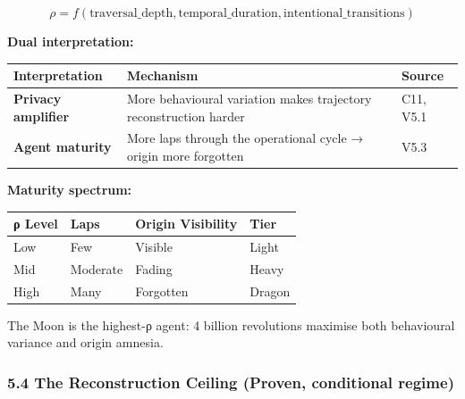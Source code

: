 \documentclass[
]{article}
\newcounter{none} %
\begin{document}
\[\rho = f(\text{traversal\_depth}, \text{temporal\_duration}, \text{intentional\_transitions})\]

\textbf{Dual interpretation:}

{\def\LTcaptype{none} %
\begin{longtable}[]{@{}
  >{\raggedright\arraybackslash}p{}
  >{\raggedright\arraybackslash}p{}
  >{\raggedright\arraybackslash}p{}@{}}
\toprule\noalign{}
\begin{minipage}[b]{\linewidth}\raggedright
Interpretation
\end{minipage} & \begin{minipage}[b]{\linewidth}\raggedright
Mechanism
\end{minipage} & \begin{minipage}[b]{\linewidth}\raggedright
Source
\end{minipage} \\
\midrule\noalign{}
\endhead
\bottomrule\noalign{}
\endlastfoot
\textbf{Privacy amplifier} & More behavioural variation makes trajectory
reconstruction harder & C11, V5.1 \\
\textbf{Agent maturity} & More laps through the operational cycle →
origin more forgotten & V5.3 \\
\end{longtable}
}

\textbf{Maturity spectrum:}

{\def\LTcaptype{none} %
\begin{longtable}[]{@{}llll@{}}
\toprule\noalign{}
ρ Level & Laps & Origin Visibility & Tier \\
\midrule\noalign{}
\endhead
\bottomrule\noalign{}
\endlastfoot
Low & Few & Visible & Light \\
Mid & Moderate & Fading & Heavy \\
High & Many & Forgotten & Dragon \\
\end{longtable}
}

The Moon is the highest-ρ agent: 4 billion revolutions maximise both
behavioural variance and origin amnesia.

\subsubsection{5.4 The Reconstruction Ceiling (Proven, conditional
regime)}\label{the-reconstruction-ceiling-proven-conditional-regime}
\end{document}
